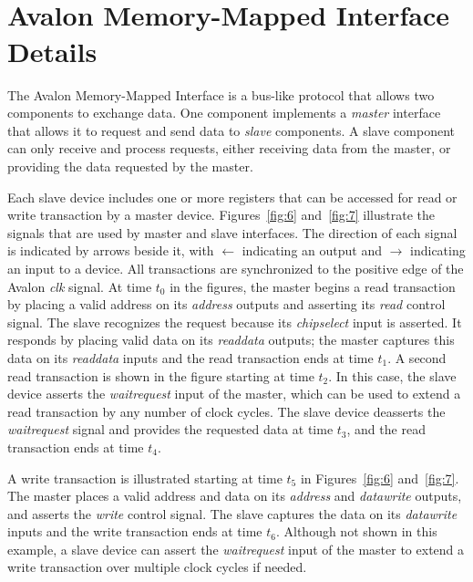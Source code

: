 \documentclass[11pt, twoside, pdftex]{article}
\begin{document}
\section{Avalon\textsuperscript{\textregistered} Memory-Mapped Interface Details}

The Avalon Memory-Mapped Interface is a bus-like protocol that allows two components to 
exchange data.  One component implements a {\it master} interface that allows it to 
request and send data to {\it slave} components.  A slave component can only receive and 
process requests, either receiving data from the master, or providing the data 
requested by the master.

Each slave device includes one or more registers that can be accessed for read or write
transaction by a master device.  Figures~\ref{fig:6} and~\ref{fig:7} 
illustrate the signals that are used by master and slave interfaces.  
The direction of each signal is indicated by arrows beside it, with 
$\leftarrow$ indicating an output and $\rightarrow$ indicating an input to a device. 
All transactions are synchronized to the positive edge of the 
Avalon {\it clk} signal. At time $t_0$ in the figures, the master begins a read
transaction by placing a valid address on its {\it address} outputs and asserting 
its {\it read} control signal. The slave recognizes the request because its {\it chipselect}
input is asserted. It responds by placing valid data on its {\it readdata} outputs; the
master captures this data on its {\it readdata} inputs and the read transaction 
ends at time $t_1$. A second read transaction
is shown in the figure starting at time $t_2$. In this case, the slave device asserts the
{\it waitrequest} input of the master, which can be used to extend a read transaction by
any number of clock cycles. The slave device deasserts the {\it waitrequest} signal and
provides the requested data at time $t_3$, and the read transaction ends at time $t_4$. 

A write transaction is illustrated starting at time $t_5$ in Figures~\ref{fig:6} and~\ref{fig:7}.
The master places a valid address and data on its {\it address} and {\it datawrite} outputs,
and asserts the {\it write} control signal. The slave captures the data on its {\it datawrite}
inputs and the write transaction ends at time $t_6$.  
Although not shown in this example, a slave device can assert the 
{\it waitrequest} input of the master to extend a write transaction over multiple clock 
cycles if needed.
\end{document}
